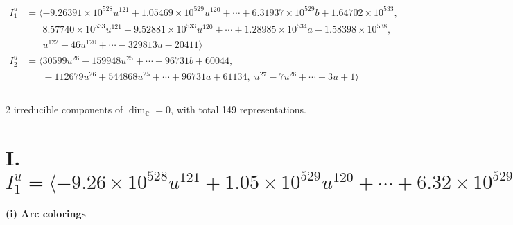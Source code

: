 \documentclass[1p]{elsarticle_modified}
\theoremstyle{definition}
\begin{document}
\begin{align*}
I^u_{1}&=\langle 
-9.26391\times10^{528} u^{121}+1.05469\times10^{529} u^{120}+\cdots+6.31937\times10^{529} b+1.64702\times10^{533},\\
\phantom{I^u_{1}}&\phantom{= \langle  }8.57740\times10^{533} u^{121}-9.52881\times10^{533} u^{120}+\cdots+1.28985\times10^{534} a-1.58398\times10^{538},\\
\phantom{I^u_{1}}&\phantom{= \langle  }u^{122}-46 u^{120}+\cdots-329813 u-20411\rangle \\
I^u_{2}&=\langle 
30599 u^{26}-159948 u^{25}+\cdots+96731 b+60044,\\
\phantom{I^u_{2}}&\phantom{= \langle  }-112679 u^{26}+544868 u^{25}+\cdots+96731 a+61134,\;u^{27}-7 u^{26}+\cdots-3 u+1\rangle \\
\\
\end{align*}
\raggedright * 2 irreducible components of $\dim_{\mathbb{C}}=0$, with total 149 representations.\\
\newpage
\renewcommand{\arraystretch}{1}
\centering \section*{I. $I^u_{1}= \langle -9.26\times10^{528} u^{121}+1.05\times10^{529} u^{120}+\cdots+6.32\times10^{529} b+1.65\times10^{533},\;8.58\times10^{533} u^{121}-9.53\times10^{533} u^{120}+\cdots+1.29\times10^{534} a-1.58\times10^{538},\;u^{122}-46 u^{120}+\cdots-329813 u-20411 \rangle$}
\flushleft \textbf{(i) Arc colorings}\\
\end{document}
